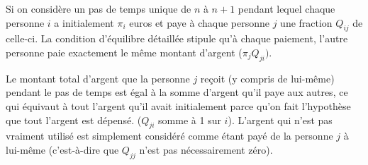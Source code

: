 \documentclass[12pt]{article}
\begin{document}
Si on considère un pas de temps unique de $n$ à $n+1$ pendant lequel chaque personne $i$ a initialement $\pi_i$ euros et paye à chaque personne $j$ une fraction $Q_{ij}$ de celle-ci. La condition d'équilibre détaillée stipule qu'à chaque paiement, l'autre personne paie exactement le même montant d'argent ($\pi_jQ_{ji})$.

Le montant total d'argent que la personne $j$ reçoit (y compris de lui-même) pendant le pas de temps est égal à la somme d'argent qu'il paye aux autres, ce qui équivaut à tout l'argent qu'il avait initialement parce qu'on fait l'hypothèse que tout l'argent est dépensé. ($Q_{ji}$ somme à 1 sur $i$). 
L'argent qui n'est pas vraiment utilisé est simplement considéré comme étant payé de la personne $j$ à lui-même (c'est-à-dire que $Q_{jj}$ n'est pas nécessairement zéro).

\end{document}
